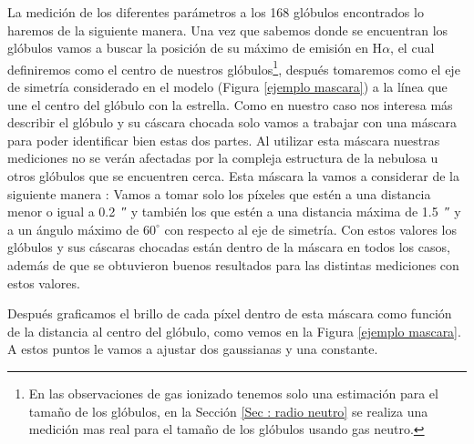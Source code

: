\documentclass{book}
\begin{document}
La medición de los diferentes parámetros a los 168 glóbulos encontrados lo haremos de la siguiente manera. Una vez que sabemos donde se encuentran los glóbulos vamos a buscar la posición de su máximo de emisión en H$\alpha$, el cual definiremos como el centro de nuestros glóbulos\footnote{En las observaciones de gas ionizado tenemos solo una estimación para el tamaño de los glóbulos, en la Sección \ref{Sec : radio neutro} se realiza una medición mas real para el tamaño de los glóbulos usando gas neutro.}, después tomaremos como el eje de simetría considerado en el modelo (Figura \ref{ejemplo mascara}) a la línea que une el centro del glóbulo con la estrella. Como en nuestro caso nos interesa más describir el glóbulo y su cáscara chocada solo vamos a trabajar con una máscara para poder identificar bien estas dos partes. Al utilizar esta máscara nuestras mediciones no se verán afectadas por la compleja estructura de la nebulosa u otros glóbulos que se encuentren cerca. Esta máscara la vamos a considerar de la siguiente manera : Vamos a tomar solo los píxeles que estén a una distancia menor o igual a \SI{0.2}{\arcsecond} y también los que estén a una distancia máxima de \SI{1.5}{\arcsecond} y a un ángulo máximo de $60^\circ$ con respecto al eje de simetría. Con estos valores los glóbulos y sus cáscaras chocadas están dentro de la máscara en todos los casos, además de que se obtuvieron buenos resultados para las distintas mediciones con estos valores.

Después graficamos el brillo de cada píxel dentro de esta máscara como función de la distancia al centro del glóbulo, como vemos en la Figura \ref{ejemplo mascara}. A estos puntos le vamos a ajustar dos gaussianas y una constante.
\end{document}
